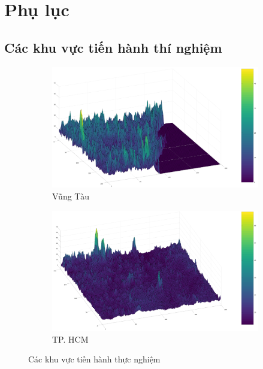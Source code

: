 \chapter*{Phụ lục}
\section*{Các khu vực tiến hành thí nghiệm}
\begin{figure}[H]  
    \begin{subfigure}[b]{\linewidth}
        \includegraphics[width=0.9\linewidth]{picture/Selection_035.png}
        \caption{Vũng Tàu}
    \end{subfigure}
    \begin{subfigure}[b]{\linewidth}
        \includegraphics[width=0.9\linewidth]{picture/Selection_036.png}
        \caption{TP. HCM}
    \end{subfigure}

    \caption{Các khu vực tiến hành thực nghiệm}
    \label{areadescription}
\end{figure}

